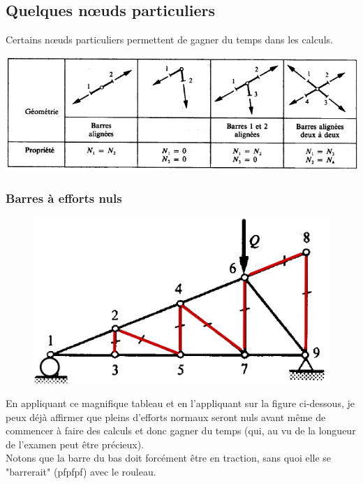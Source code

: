 	\subsection{Quelques nœuds particuliers}
	Certains nœuds particuliers permettent de gagner du temps dans les calculs.
	\begin{center}
	\includegraphics[scale=0.5]{ch3/image6.png}
	\end{center}
	
	
		\subsubsection{Barres à efforts nuls}
		\begin{figure}
		\vspace{-6mm}
		\includegraphics[scale=0.4]{ch3/image7.png}
		\end{figure}
		En appliquant ce magnifique tableau et en l'appliquant sur la figure 
		ci-dessous, je peux déjà affirmer que pleins d'efforts normaux seront 
		nuls avant même de commencer à faire des calculs et donc gagner du 
		temps (qui, au vu de la longueur de l'examen peut être précieux).\\
		Notons que la barre du bas doit forcément être en traction, sans quoi 
		elle se "barrerait" (pfpfpf) avec le rouleau. 
		
